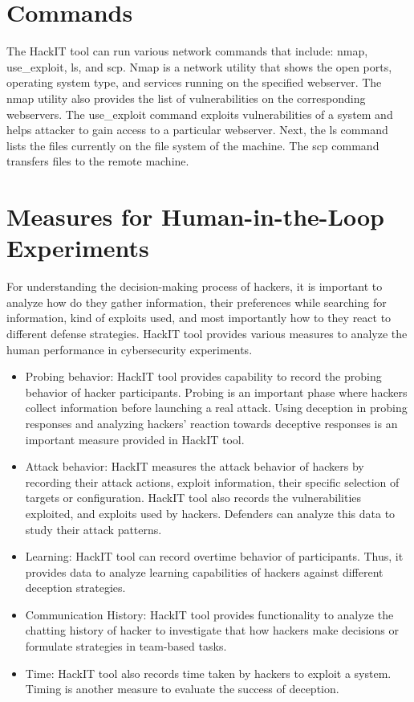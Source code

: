 \section{Commands}
The HackIT tool can run various network commands that include: nmap, use\_exploit, ls, and scp. Nmap is a network utility that shows the open ports, operating system type, and services running on the specified webserver. The nmap utility also provides the list of vulnerabilities on the corresponding webservers. The use\_exploit command exploits vulnerabilities of a system and helps attacker to gain access to a particular webserver. Next, the ls command lists the files currently on the file system of the machine. The scp command transfers files to the remote machine.
\section{Measures for Human-in-the-Loop Experiments}
For understanding the decision-making process of hackers, it is important to analyze how do they gather information, their preferences while searching for information, kind of exploits used, and most importantly how to they react to different defense strategies. HackIT tool provides various measures to analyze the human performance in cybersecurity experiments.

\begin{itemize}
    \item Probing behavior: HackIT tool provides capability to record the probing behavior of hacker participants. Probing is an important phase where hackers collect information before launching a real attack. Using deception in probing responses and analyzing hackers’ reaction towards deceptive responses is an important measure provided in HackIT tool.
    \item Attack behavior: HackIT measures the attack behavior of hackers by recording their attack actions, exploit information, their specific selection of targets or configuration. HackIT tool also records the vulnerabilities exploited, and exploits used by hackers. Defenders can analyze this data to study their attack patterns.
    \item Learning: HackIT tool can record overtime behavior of participants. Thus, it provides data to analyze learning capabilities of hackers against different deception strategies.
    \item Communication History: HackIT tool provides functionality to analyze the chatting history of hacker to investigate that how hackers make decisions or formulate strategies in team-based
    tasks.
    \item Time: HackIT tool also records time taken by hackers to exploit a system. Timing is another measure to evaluate the success of deception.
\end{itemize}
\clearpage 